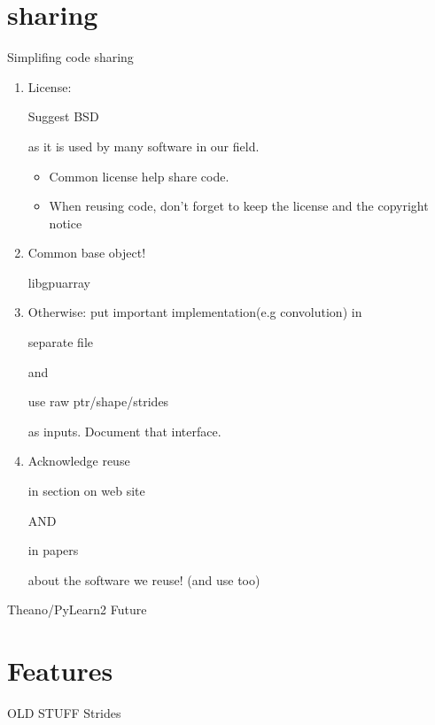 \documentclass[utf8x,xcolor=pdftex,dvipsnames,table]{beamer}
\begin{document}
\section{sharing}
\begin{frame}{Simplifing code sharing}
\begin{enumerate}
  \item<1-> License: \begin{bf}Suggest BSD\end{bf} as it is used by many software in our field.
    \begin{itemize}
    \item Common license help share code.
    \item When reusing code, don't forget to keep the license and the copyright notice
    \end{itemize}
  \item<2-> Common base object! \begin{bf}libgpuarray\end{bf}
  \item<3-> Otherwise: put important implementation(e.g convolution) in \begin{bf}separate file\end{bf} and \begin{bf}use raw ptr/shape/strides\end{bf} as inputs. Document that interface.
  \item<4-> Acknowledge reuse \begin{bf}in section on web site\end{bf} AND \begin{bf}in papers\end{bf} about the software we reuse! (and use too)
\end{enumerate}

\end{frame}

\begin{frame}{Theano/PyLearn2 Future}
\end{frame}

\section{Features}

\begin{frame}{OLD STUFF Strides}
\begin{center}
\hspace{5em}
\end{center}
\begin{center}
\end{center}
\end{frame}
\end{document}
